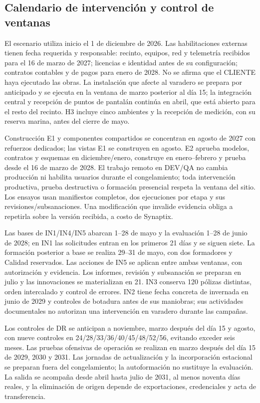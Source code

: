 \subsection{Calendario de intervención y control de ventanas}
El escenario utiliza inicio el 1 de diciembre de 2026. Las habilitaciones externas tienen fecha requerida y responsable: recinto, equipos, red y telemetría recibidos para el 16 de marzo de 2027; licencias e identidad antes de su configuración; contratos contables y de pagos para enero de 2028. No se afirma que el CLIENTE haya ejecutado las obras. La instalación que afecte al varadero se prepara por anticipado y se ejecuta en la ventana de marzo posterior al día 15; la integración central y recepción de puntos de pantalán continúa en abril, que está abierto para el resto del recinto. H3 incluye cinco ambientes y la recepción de medición, con su reserva marina, antes del cierre de mayo.

Construcción E1 y componentes compartidos se concentran en agosto de 2027 con refuerzos dedicados; las vistas E1 se construyen en agosto. E2 aprueba modelos, contratos y esquemas en diciembre/enero, construye en enero--febrero y prueba desde el 16 de marzo de 2028. El trabajo remoto en DEV/QA no cambia producción ni habilita usuarios durante el congelamiento; toda intervención productiva, prueba destructiva o formación presencial respeta la ventana del sitio. Los ensayos usan manifiestos completos, dos ejecuciones por etapa y sus revisiones/subsanaciones. Una modificación que invalide evidencia obliga a repetirla sobre la versión recibida, a costo de Synaptix.

Las bases de IN1/IN4/IN5 abarcan 1--28 de mayo y la evaluación 1--28 de junio de 2028; en IN1 las solicitudes entran en los primeros 21 días y se siguen siete. La formación posterior a base se realiza 29--31 de mayo, con dos formadores y Calidad reservados. Las acciones de IN5 se aplican entre ambas ventanas, con autorización y evidencia. Los informes, revisión y subsanación se preparan en julio y las innovaciones se materializan en 21. IN3 conserva 120 pólizas distintas, orden intercalado y control de errores. IN2 tiene fecha concreta de invernada en junio de 2029 y controles de botadura antes de sus maniobras; sus actividades documentales no autorizan una intervención en varadero durante las campañas.

Los controles de DR se anticipan a noviembre, marzo después del día 15 y agosto, con nueve controles en 24/28/33/36/40/45/48/52/56, evitando exceder seis meses. Las pruebas ofensivas de operación se realizan en marzo después del día 15 de 2029, 2030 y 2031. Las jornadas de actualización y la incorporación estacional se preparan fuera del congelamiento; la autoformación no sustituye la evaluación. La salida se acompaña desde abril hasta julio de 2031, al menos noventa días reales, y la eliminación de origen depende de exportaciones, credenciales y acta de transferencia.

